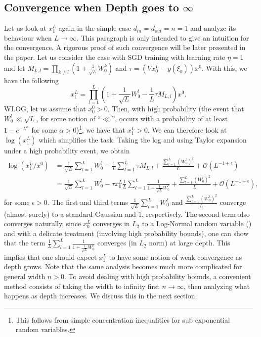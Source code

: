\subsection{Convergence when Depth goes to $\infty$}
Let us look at $x^L_1$ again in the simple case $d_{in} = d_{out} = n = 1$ and analyze its behaviour when $L \to \infty$. This paragraph is only intended to give an intuition for the convergence. A rigorous proof of such convergence will be later presented in the paper. Let us consider the case with SGD training with learning rate $\eta = 1$ and let $M_{L,l}=\prod_{k \neq l} \left(1 + \frac{1}{\sqrt{L}} W_0^k\right)$ and $\tau = (V x^L_0 - y(\xi_0))x^0$. With this, we have the following 
\begin{equation}
x^L_1 = \prod_{l=1}^L \left( 1 + \frac{1}{\sqrt{L}} W^l_0 - \frac{1}{L} \tau M_{L,l}   \right) x^0.
\end{equation}
WLOG, let us assume that $x^0_0 > 0$. Then, with high probability (the event that $W^l_0 \ll \sqrt{L}$, for some notion of ``$\ll$'', occurs with a probability of at least $1 - e^{-L^{\alpha}}$ for some $\alpha>0$)\footnote{This follows from simple concentration inequalities for sub-exponential random variables.}, we have that $x^L_1 > 0$. We can therefore look at $\log(x^L_1)$ which simplifies the task. Taking the log and using Taylor expansion under a high probability event, we obtain
\begin{equation*}
\begin{aligned}
\log(x^L_1 / x^0) &= \frac{1}{\sqrt{L}} \sum_{l=1}^L W^l_0 - \frac{1}{L} \sum_{l=1}^L \tau M_{L,l}  + \frac{\sum_{l=1}^L (W^l_0)^2}{L} + \mathcal{O}(L^{-1+\epsilon})\\
&= \frac{1}{\sqrt{L}} \sum_{l=1}^L W^l_0 -  \tau x^L_0  \frac{1}{L} \sum_{l=1}^L \frac{1}{1 + \frac{1}{\sqrt{L}}W^l_0}  + \frac{\sum_{l=1}^L (W^l_0)^2}{L} + \mathcal{O}(L^{-1+\epsilon}),
\end{aligned}
\end{equation*}
for some $\epsilon > 0$. The first and third terms $\frac{1}{\sqrt{L}} \sum_{l=1}^L W^l_0 $ and $\frac{\sum_{l=1}^L (W^l_0)^2}{L}$ converge (almost surely) to a standard Gaussian and $1$, respectively. The second term also converges naturally, since $x^L_0$ converges in $L_2$ to a Log-Normal random variable (\cite{hayou2023infinitedepth}) and with a delicate treatment (involving high probability bounds), one can show that the term $\frac{1}{L} \sum_{l=1}^L \frac{1}{1 + \frac{1}{\sqrt{L}}W^l_0}$ converges (in $L_2$ norm) at large depth. This implies that one should expect $x^L_1$ to have some notion of weak convergence as depth grows. Note that the same analysis becomes much more complicated for general width $n > 0$. To avoid dealing with high probability bounds, a convenient method consists of taking the width to infinity first $n \to \infty$, then analyzing what happens as depth increases. We discuss this in the next section.
